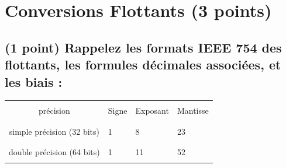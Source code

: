 \documentclass[11pt,a4paper]{article}
\begin{document}
\section{Conversions Flottants (3 points)}

\subsection{(1 point) Rappelez les formats IEEE 754 des flottants, les formules décimales associées, et les biais : }

\bigskip

\begin{center}
\begin{tabular}{c | C{2cm} | C{2.5cm} | C{3cm} }
 & & & \\
précision & Signe & Exposant & Mantisse \\
 & & & \\
\hline
 & & & \\
simple précision (32 bits) & 1 & 8 & 23 \\
 & & & \\
\hline
 & & & \\
double précision (64 bits) & 1 & 11 & 52 \\
 & & & \\
\end{tabular}
\end{center}

\bigskip
\end{document}
